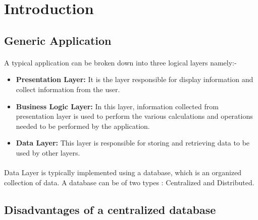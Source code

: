 \documentclass{article}
\begin{document}

\section{Introduction}
    \subsection{Generic Application}
        \paragraph{} A typical application can be broken down into three logical layers namely:-
        \begin{itemize}
            \item \textbf{Presentation Layer: }It is the layer responsible for display information and collect information from the user.
            \item \textbf{Business Logic Layer: }In this layer, information collected from presentation layer is used to perform the various calculations and operations needed to be performed by the application.
            \item \textbf{Data Layer: }This layer is responsible for storing and retrieving data to be used by other layers.
        \end{itemize}

        \paragraph{}Data Layer is typically implemented using a database, which is an organized collection of data. A database can be of two types : Centralized and Distributed.
        
    \subsection{Disadvantages of a centralized database}
\end{document}
